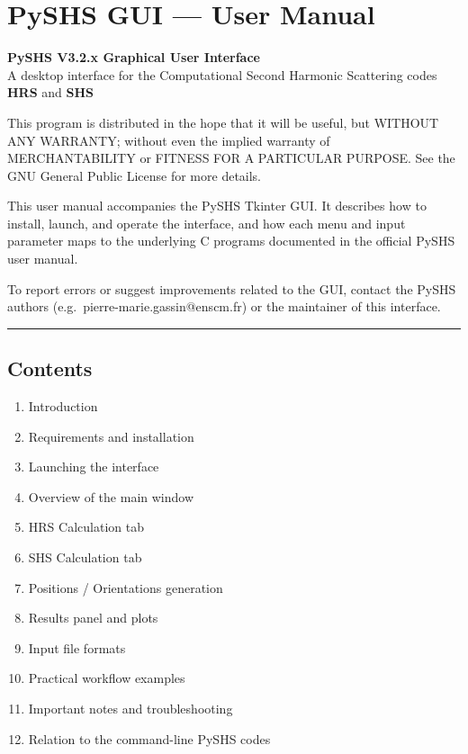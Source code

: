 \hypertarget{pyshs-gui-user-manual}{%
\section{PySHS GUI --- User Manual}\label{pyshs-gui-user-manual}}

\textbf{PySHS V3.2.x Graphical User Interface}\\
A desktop interface for the Computational Second Harmonic Scattering
codes \textbf{HRS} and \textbf{SHS}

This program is distributed in the hope that it will be useful, but
WITHOUT ANY WARRANTY; without even the implied warranty of
MERCHANTABILITY or FITNESS FOR A PARTICULAR PURPOSE. See the GNU General
Public License for more details.

This user manual accompanies the PySHS Tkinter GUI. It describes how to
install, launch, and operate the interface, and how each menu and input
parameter maps to the underlying C programs documented in the official
PySHS user manual.

To report errors or suggest improvements related to the GUI, contact the
PySHS authors (e.g.~pierre-marie.gassin@enscm.fr) or the maintainer of
this interface.

\begin{center}\rule{0.5\linewidth}{0.5pt}\end{center}

\hypertarget{contents}{%
\subsection{Contents}\label{contents}}

\begin{enumerate}
\def\labelenumi{\arabic{enumi}.}
\tightlist
\item
  Introduction\\
\item
  Requirements and installation\\
\item
  Launching the interface\\
\item
  Overview of the main window\\
\item
  HRS Calculation tab\\
\item
  SHS Calculation tab\\
\item
  Positions / Orientations generation\\
\item
  Results panel and plots\\
\item
  Input file formats\\
\item
  Practical workflow examples\\
\item
  Important notes and troubleshooting\\
\item
  Relation to the command-line PySHS codes
\end{enumerate}

